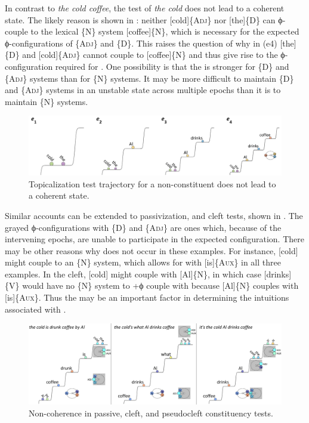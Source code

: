   In contrast to \textit{the cold coffee}, the  test of \textit{the cold} does not lead to a coherent state. The likely reason is shown in {}: neither [cold]\{A\textsc{dj}\} nor [the]\{D\} can ϕ-couple to the lexical \{N\} system [coffee]\{N\}, which is necessary for the expected ϕ-configurations of \{A\textsc{dj}\} and \{D\}. This raises the question of why in (e4) [the]\{D\} and [cold]\{A\textsc{dj}\} cannot couple to [coffee]\{N\} and thus give rise to the ϕ-configuration required for . One possibility is that the  is stronger for \{D\} and \{A\textsc{dj}\} systems than for \{N\} systems. It may be more difficult to maintain \{D\} and \{A\textsc{dj}\} systems in an unstable state across multiple epochs than it is to maintain \{N\} systems.

  
\begin{figure}
\includegraphics[width=\textwidth]{figures/Tilsen-img139.png}
\caption{Topicalization test trajectory for a non-constituent does not lead to a coherent state.}
\label{fig:6:20}
\end{figure}
 

  Similar accounts can be extended to passivization,  and cleft tests, shown in {}. The grayed ϕ-configurations with \{D\} and \{A\textsc{dj}\} are ones which, because of the intervening epochs, are unable to participate in the expected configuration. There may be other reasons why  does not occur in these examples. For instance, [cold] might couple to an \{N\} system, which allows for  with [is]\{A\textsc{ux}\} in all three examples. In the cleft, [cold] might couple with [Al]\{N\}, in which case [drinks]\{V\} would have no \{N\} system to +ϕ couple with because [Al]\{N\} couples with [is]\{A\textsc{ux}\}. Thus the  may be an important factor in determining the  intuitions associated with .   

  
\begin{figure}
\includegraphics[width=\textwidth]{figures/Tilsen-img140.png}
\caption{Non-coherence in passive, cleft, and pseudocleft constituency tests.}
\label{fig:6:21}
\end{figure}
 

